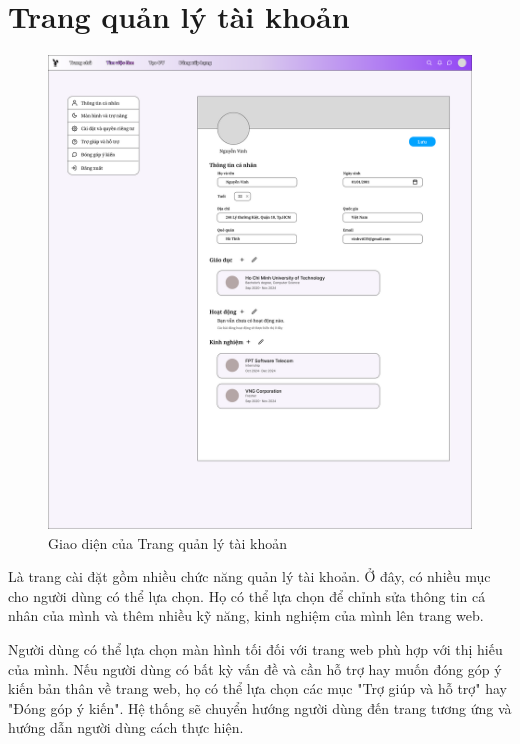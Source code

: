 \section{Trang quản lý tài khoản}

\begin{figure}[H]
\begin{center}
    \includegraphics[scale=0.2]{img/ProfileManagement.png}
    \caption{Giao diện của Trang quản lý tài khoản}
\end{center}
\end{figure}

Là trang cài đặt gồm nhiều chức năng quản lý tài khoản. Ở đây, có nhiều mục cho người dùng có thể lựa chọn. Họ có thể lựa chọn để chỉnh sửa thông tin cá nhân của mình và thêm nhiều kỹ năng, kinh nghiệm của mình lên trang web.

Người dùng có thể lựa chọn màn hình tối đối với trang web phù hợp với thị hiếu của mình. Nếu người dùng có bất kỳ vấn đề và cần hỗ trợ hay muốn đóng góp ý kiến bản thân về trang web, họ có thể lựa chọn các mục "Trợ giúp và hỗ trợ" hay "Đóng góp ý kiến". Hệ thống sẽ chuyển hướng người dùng đến trang tương ứng và hướng dẫn người dùng cách thực hiện.